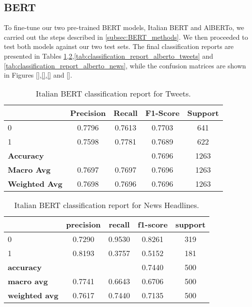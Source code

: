 \subsection{BERT}
\label{subsec:BERT_results}
To fine-tune our two pre-trained BERT models, Italian BERT and AlBERTo, we carried out the steps described in \ref{subsec:BERT_methods}. We then proceeded to test both models against our two test sets. The final classification reports are presented in Tables \ref{tab:classification_report_bert_base_tweets},\ref{tab:classification_report_bert_base_news},\ref{tab:classification_report_alberto_tweets} and \ref{tab:classification_report_alberto_news}, while the confusion matrices are shown in Figures \ref{},\ref{},\ref{} and \ref{}.

\begin{table}[h]
    \centering
    \small
    \begin{tabular}{lcccc}
        \toprule
        & \textbf{Precision} & \textbf{Recall} & \textbf{F1-Score} & \textbf{Support} \\
        \midrule
        0 & 0.7796 & 0.7613 & 0.7703 & 641 \\
        1 & 0.7598 & 0.7781 & 0.7689 & 622 \\
        \midrule
        \textbf{Accuracy} & & & 0.7696 & 1263 \\
        \textbf{Macro Avg} & 0.7697 & 0.7697 & 0.7696 & 1263 \\
        \textbf{Weighted Avg} & 0.7698 & 0.7696 & 0.7696 & 1263 \\
        \bottomrule
    \end{tabular}
    \caption{Italian BERT classification report for Tweets.}
    \label{tab:classification_report_bert_base_tweets}
\end{table}

\begin{table}[h]
    \centering
    \small
    \begin{tabular}{lcccc}
        \toprule
        & \textbf{precision} & \textbf{recall} & \textbf{f1-score} & \textbf{support} \\
        \midrule
        0 & 0.7290 & 0.9530 & 0.8261 & 319 \\
        1 & 0.8193 & 0.3757 & 0.5152 & 181 \\
        \midrule
        \textbf{accuracy} & & & 0.7440 & 500 \\
        \textbf{macro avg} & 0.7741 & 0.6643 & 0.6706 & 500 \\
        \textbf{weighted avg} & 0.7617 & 0.7440 & 0.7135 & 500 \\
        \bottomrule
    \end{tabular}
    \caption{Italian BERT classification report for News Headlines.}
    \label{tab:classification_report_bert_base_news}
\end{table}

